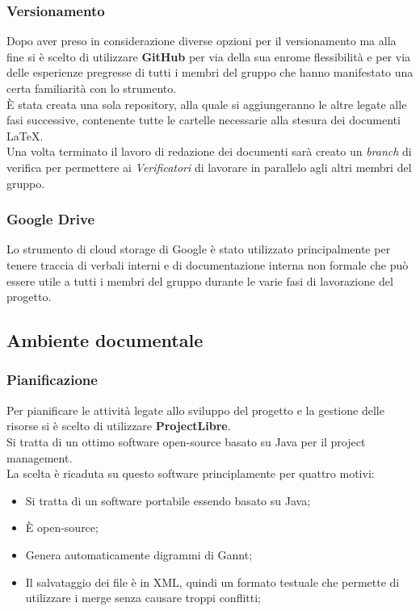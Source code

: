     \subsubsection{Versionamento}
      Dopo aver preso in considerazione diverse opzioni per il versionamento ma alla fine si è scelto di utilizzare \textbf{GitHub} per via della
      sua enrome flessibilità e per via delle esperienze pregresse di tutti i membri del gruppo che hanno manifestato una certa familiarità con
      lo strumento.\\
      È stata creata una sola repository, alla quale si aggiungeranno le altre legate alle fasi successive, contenente tutte le cartelle necessarie
      alla stesura dei documenti \LaTeX.\\
      Una volta terminato il lavoro di redazione dei documenti sarà creato un \emph{branch} di verifica per permettere ai \emph{Verificatori} di
      lavorare in parallelo agli altri membri del gruppo.
    \subsubsection{Google Drive}
      Lo strumento di cloud storage di Google è stato utilizzato principalmente per tenere traccia di verbali interni e di documentazione interna
      non formale che può essere utile a tutti i membri del gruppo durante le varie fasi di lavorazione del progetto.
  \subsection{Ambiente documentale}
    \subsubsection{Pianificazione}
      Per pianificare le attività legate allo sviluppo del progetto e la gestione delle risorse si è scelto di utilizzare \textbf{ProjectLibre}.\\
      Si tratta di un ottimo software open-source basato su Java per il project management.\\
      La scelta è ricaduta su questo software principlamente per quattro motivi:
      \begin{itemize}
        \item Si tratta di un software portabile essendo basato su Java;
        \item È open-source;
        \item Genera automaticamente digrammi di Gannt;
        \item Il salvataggio dei file è in XML, quindi un formato testuale che permette di utilizzare i merge senza causare troppi conflitti;
      \end{itemize}
